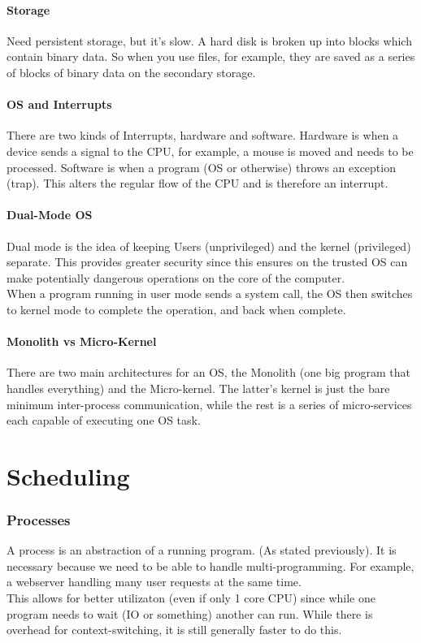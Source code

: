 \documentclass[12pt]{article}
\theoremstyle{definition}
\begin{document}
\subsection{Storage}
Need persistent storage, but it's slow. A hard disk is broken up into blocks which contain binary data. So when you use files, for example, they are saved as a series of blocks of binary data on the secondary storage.

\subsection{OS and Interrupts}
There are two kinds of Interrupts, hardware and software. Hardware is when a device sends a signal to the CPU, for example, a mouse is moved and needs to be processed. Software is when a program (OS or otherwise) throws an exception (trap). This alters the regular flow of the CPU and is therefore an interrupt.

\subsection{Dual-Mode OS}
Dual mode is the idea of keeping Users (unprivileged) and the kernel (privileged) separate. This provides greater security since this ensures on the trusted OS can make potentially dangerous operations on the core of the computer. 
\\ \linebreak
When a program running in user mode sends a system call, the OS then switches to kernel mode to complete the operation, and back when complete.
\\ \linebreak

\subsection{Monolith vs Micro-Kernel}
There are two main architectures for an OS, the Monolith (one big program that handles everything) and the Micro-kernel. The latter's kernel is just the bare minimum inter-process communication, while the rest is a series of micro-services each capable of executing one OS task.

\part{Scheduling}
\section{Processes}
A process is an abstraction of a running program. (As stated previously). It is necessary because we need to be able to handle multi-programming. For example, a webserver handling many user requests at the same time.
\\ \linebreak
This allows for better utilizaton (even if only 1 core CPU) since while one program needs to wait (IO or something) another can run. While there is overhead for context-switching, it is still generally faster to do this.
\end{document}
